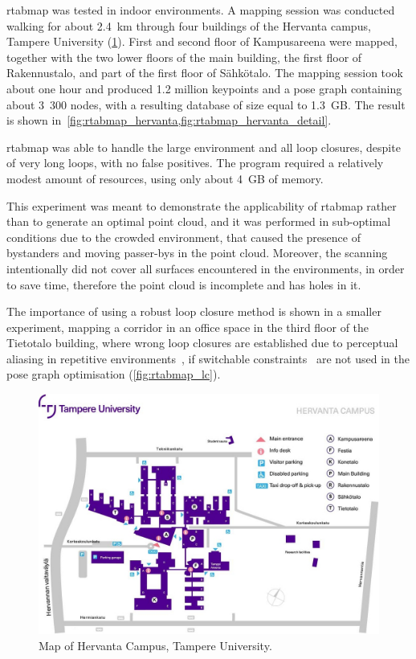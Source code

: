\documentclass[11pt, letterpaper, twoside]{article}
\begin{document}
\gls{rtabmap} was tested in indoor environments. A mapping session was
conducted walking for about 2.4~km through four buildings of the Hervanta
campus, Tampere University (\cref{fig:campus_map}). First and second floor of
Kampusareena were mapped, together with the two lower floors of the main
building, the first floor of Rakennustalo, and part of the first floor of
Sähkötalo. The mapping session took about one hour and produced 1.2 million
keypoints and a pose graph containing about 3~300 nodes, with a resulting
database of size equal to 1.3~GB. The result is shown
in~\cref{fig:rtabmap_hervanta,fig:rtabmap_hervanta_detail}.

\gls{rtabmap} was able to handle the large environment and all loop closures,
despite of very long loops, with no false positives. The program required a
relatively modest amount of resources, using only about 4~GB of memory.

This experiment was meant to demonstrate the applicability of \gls{rtabmap}
rather than to generate an optimal point cloud, and it was performed in
sub-optimal conditions due to the crowded environment, that caused the presence
of bystanders and moving passer-bys in the point cloud. Moreover, the scanning
intentionally did not cover all surfaces encountered in the environments, in
order to save time, therefore the point cloud is incomplete and has holes in
it.

The importance of using a robust loop closure method is shown in a smaller
experiment, mapping a corridor in an office space in the third floor of the
Tietotalo building, where wrong loop closures are established due to perceptual
aliasing in repetitive environments~\cite{lajoie2019modeling}, if switchable
constraints~\cite{sunderhauf2012switchable} are not used in the pose graph
optimisation (\cref{fig:rtabmap_lc}).

\begin{figure}[tb]
    \centering
    \includegraphics[width=0.9\linewidth]{campus_map.jpg}
    \caption{Map of Hervanta Campus, Tampere University.}\label{fig:campus_map}
\end{figure}
\end{document}
